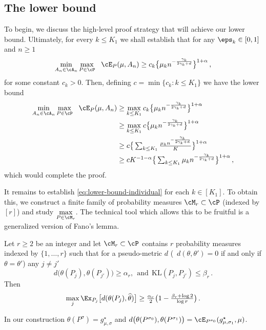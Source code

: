 \subsection{The lower bound}
To begin, we discuss the high-level proof strategy that will achieve our lower bound. Ultimately, for every $k \le K_1$ we shall establish that for any $\eps_k \in [0, 1]$ and $n \ge 1$
\begin{equation} \label{eq:lower-bound-individual}
     \textstyle  \min\limits_{A_n \in \cA_n} \max\limits_{P \in \cP} ~~ \cE_P(\mu, A_n) \ge c_k \big \{ \mu_k n^{- \frac{\gamma_k}{2\gamma_k + d}}\big\}^{1+\alpha} \,,
\end{equation} for some constant $c_k > 0$. Then, defining $c = \min\{c_k: k \le K_1\}$ we have the lower bound
\[
\begin{aligned}
    \textstyle  \min\limits_{A_n \in \cA_n} \max\limits_{P \in \cP} ~~ \cE_P(\mu, A_n) & \ge \textstyle  \max\limits_{k \le K_1 } c_k \big \{ \mu_k n^{- \frac{\gamma_k}{2\gamma_k + d}}\big\}^{1+\alpha}\\
    & \ge \textstyle  \max\limits_{k \le K_1 } c \big \{ \mu_k n^{- \frac{\gamma_k}{2\gamma_k + d}}\big\}^{1+\alpha}\\
    & \ge \textstyle  c  \big \{ \sum_{k \le K_1 }\frac{\mu_k n^{- \frac{\gamma_k}{2\gamma_k + d}}}{K}\big\}^{1+\alpha}\\
    & \ge \textstyle  c K^{-1-\alpha}  \big \{ \sum_{k \le K_1 }{\mu_k n^{- \frac{\gamma_k}{2\gamma_k + d}}}\big\}^{1+\alpha}\,,\\
\end{aligned}
\] which would complete the proof. 

It remains to establish \eqref{eq:lower-bound-individual} for each $k \in [K_1]$. To obtain this, we construct a finite family of probability measures $\cM_r \subset \cP$ (indexed by $[r]$) and study $\max\limits_{P \in \cM_r}$. The technical tool which allows this to be fruitful is a generalized version of Fano's lemma. 

\begin{lemma}
\label{lemma:fano}
Let $r \ge 2$ be an integer and let $\cM_r \subset \cP$ contains $r$ probability measures indexed by $\{1, \dots , r\}$ such that for a pseudo-metric $d$ (\ie\ $d(\theta , \theta') = 0$ if and only if $\theta = \theta'$) any $j \neq j'$
\[
\textstyle d\big (\theta(P_j), \theta(P_{j'})\big) \ge \alpha_r , ~~\text{and} ~~ \text{KL}(P_j , P_{j'}) \le \beta_r\,.
\] Then 
\[
\textstyle \max\limits_j \Ex_{P_j}\big[ d(\theta(P_j), \widehat \theta)\big ] \ge \frac{\alpha_r}{2} \big (1 - \frac{\beta_r + \log 2}{\log r}\big )\,. 
\]
    
\end{lemma} In our construction $\theta(P^\sigma)  = g^\star_{\mu, \sigma}$ and $d\big (\theta(P^{\sigma_0}), \theta(P^{\sigma_1})\big) = \cE_{P^{\sigma_0}}(g^\star_{\mu, \sigma_{1}}, \mu)$. 

